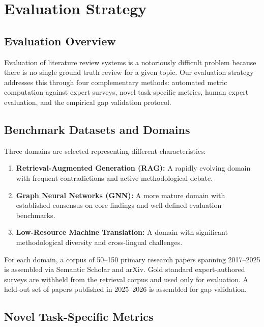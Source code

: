 \section{Evaluation Strategy}

\subsection{Evaluation Overview}

Evaluation of literature review systems is a notoriously difficult problem because there is no single ground truth review for a given topic. Our evaluation strategy addresses this through four complementary methods: automated metric computation against expert surveys, novel task-specific metrics, human expert evaluation, and the empirical gap validation protocol.

\subsection{Benchmark Datasets and Domains}

Three domains are selected representing different characteristics:

\begin{enumerate}
    \item \textbf{Retrieval-Augmented Generation (RAG):} A rapidly evolving domain with frequent contradictions and active methodological debate.
    \item \textbf{Graph Neural Networks (GNN):} A more mature domain with established consensus on core findings and well-defined evaluation benchmarks.
    \item \textbf{Low-Resource Machine Translation:} A domain with significant methodological diversity and cross-lingual challenges.
\end{enumerate}

For each domain, a corpus of 50--150 primary research papers spanning 2017--2025 is assembled via Semantic Scholar and arXiv. Gold standard expert-authored surveys are withheld from the retrieval corpus and used only for evaluation. A held-out set of papers published in 2025--2026 is assembled for gap validation.

\subsection{Novel Task-Specific Metrics}

